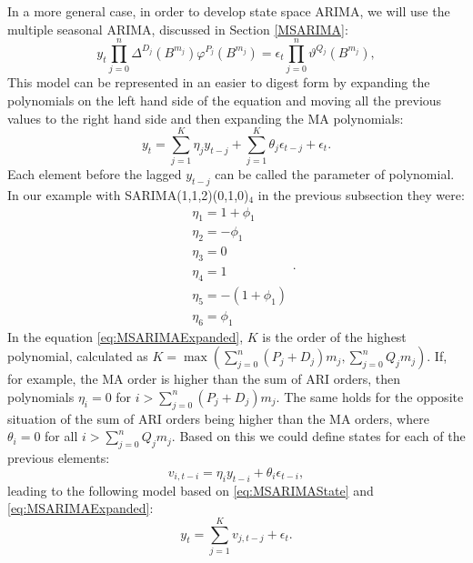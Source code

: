 \documentclass[
]{book}
\theoremstyle{definition}
\theoremstyle{definition}
\theoremstyle{definition}
\theoremstyle{definition}
\theoremstyle{remark}
\begin{document}
In a more general case, in order to develop state space ARIMA, we will use the multiple seasonal ARIMA, discussed in Section \ref{MSARIMA}:
\begin{equation*}
  y_t \prod_{j=0}^n \Delta^{D_j} (B^{m_j}) \varphi^{P_j}(B^{m_j}) = \epsilon_t \prod_{j=0}^n \vartheta^{Q_j}(B^{m_j}) ,
\end{equation*}
This model can be represented in an easier to digest form by expanding the polynomials on the left hand side of the equation and moving all the previous values to the right hand side and then expanding the MA polynomials:
\begin{equation}
  y_t = \sum_{j=1}^K \eta_j y_{t-j} + \sum_{j=1}^K \theta_j \epsilon_{t-j} + \epsilon_t .
  \label{eq:MSARIMAExpanded}
\end{equation}
Each element before the lagged \(y_{t-j}\) can be called the parameter of polynomial. In our example with SARIMA(1,1,2)(0,1,0)\(_4\) in the previous subsection they were:
\begin{equation*}
    \begin{aligned}
    & \eta_1 = 1+\phi_1 \\
    & \eta_2 = -\phi_1 \\
    & \eta_3 = 0 \\
    & \eta_4 = 1 \\
    & \eta_5 = -(1+\phi_1) \\
    & \eta_6 = \phi_1
    \end{aligned} .
\end{equation*}
In the equation \eqref{eq:MSARIMAExpanded}, \(K\) is the order of the highest polynomial, calculated as \(K=\max\left(\sum_{j=0}^n (P_j + D_j)m_j, \sum_{j=0}^n Q_j m_j\right)\). If, for example, the MA order is higher than the sum of ARI orders, then polynomials \(\eta_i=0\) for \(i>\sum_{j=0}^n (P_j + D_j)m_j\). The same holds for the opposite situation of the sum of ARI orders being higher than the MA orders, where \(\theta_i=0\) for all \(i>\sum_{j=0}^n Q_j m_j\). Based on this we could define states for each of the previous elements:
\begin{equation}
  v_{i,t-i} = \eta_i y_{t-i} + \theta_i \epsilon_{t-i},
  \label{eq:MSARIMAState}
\end{equation}
leading to the following model based on \eqref{eq:MSARIMAState} and \eqref{eq:MSARIMAExpanded}:
\begin{equation}
  y_t = \sum_{j=1}^K v_{j,t-j} + \epsilon_t .
  \label{eq:MSARIMAMeasurement01}
\end{equation}
\end{document}
